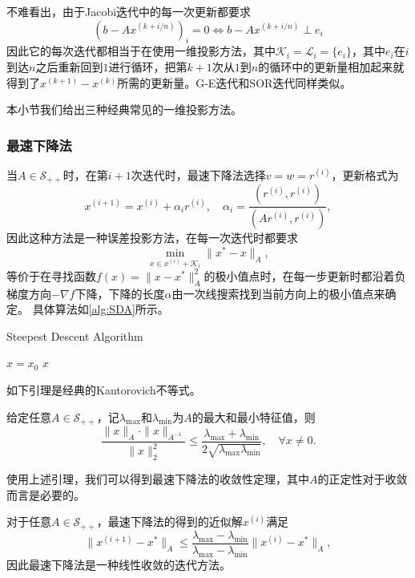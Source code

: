 \documentclass[a4paper,10pt]{ctexart}
\begin{document}
不难看出，由于Jacobi迭代中的每一次更新都要求
\[
    (b - Ax^{(k+i / n)})_i = 0 \iff b - Ax^{(k+i / n)} \perp e_i
\]
因此它的每次迭代都相当于在使用一维投影方法，其中$ \mathcal{K}_i = \mathcal{L}_i = \{e_i\} $，其中$ e_i $在$ i $到达$ n $之后重新回到$ 1 $进行循环，把第$ k+1 $次从$ 1 $到$ n $的循环中的更新量相加起来就得到了$ x^{(k+1)}-x^{(k)} $所需的更新量。G-E迭代和SOR迭代同样类似。

本小节我们给出三种经典常见的一维投影方法。
\subsubsection{最速下降法}
当$ A\in \mathcal{S}_{++} $时，在第$ i+1 $次迭代时，最速下降法选择$ v = w = r^{(i)} $，更新格式为
\begin{equation}
    x^{(i+1)} = x^{(i)} + \alpha_i r^{(i)},\quad \alpha_i = \frac{(r^{(i)}, r^{(i)})}{(Ar^{(i)}, r^{(i)})},
\end{equation}
因此这种方法是一种误差投影方法，在每一次迭代时都要求
\[
    \min_{x\in x^{(i)} + \mathcal{K}_i} \| x^* - x \|_A,
\]
等价于在寻找函数$ f(x) = \| x-x^* \|_A^2 $的极小值点时，在每一步更新时都沿着负梯度方向$ -\nabla f $下降，下降的长度$ \alpha $由一次线搜索找到当前方向上的极小值点来确定。
具体算法如\ref{alg:SDA}所示。
\begin{algorithm}[htbp]
    \caption{Steepest Descent Algorithm}\label{alg:SDA}
    $ x = x_0 $\;
    \Return $ x $\;
\end{algorithm}

如下引理是经典的Kantorovich不等式。
\begin{lemma}
    给定任意$ A\in \mathcal{S}_{++} $，记$ \lambda_{\max} $和$ \lambda_{\min} $为$ A $的最大和最小特征值，则
    \begin{equation}
        \frac{\| x \|_A\cdot \| x \|_{A^{-1}}}{\| x \|_2^2}\leqslant \frac{\lambda_{\max}+\lambda_{\min}}{2\sqrt{\lambda_{\max}\lambda_{\min}} },\quad \forall x\ne 0.
    \end{equation}
\end{lemma}
\noindent 使用上述引理，我们可以得到最速下降法的收敛性定理，其中$ A $的正定性对于收敛而言是必要的。
\begin{theorem}
    对于任意$ A\in \mathcal{S}_{++} $，最速下降法的得到的近似解$ x^{(i)} $满足
    \begin{equation}
        \| x^{(i+1)} - x^* \|_A \leqslant \frac{\lambda_{\max} - \lambda_{\min}}{\lambda_{\max} - \lambda_{\min}} \| x^{(i)} - x^* \|_A,
    \end{equation}
    因此最速下降法是一种线性收敛的迭代方法。
\end{theorem}
\end{document}
